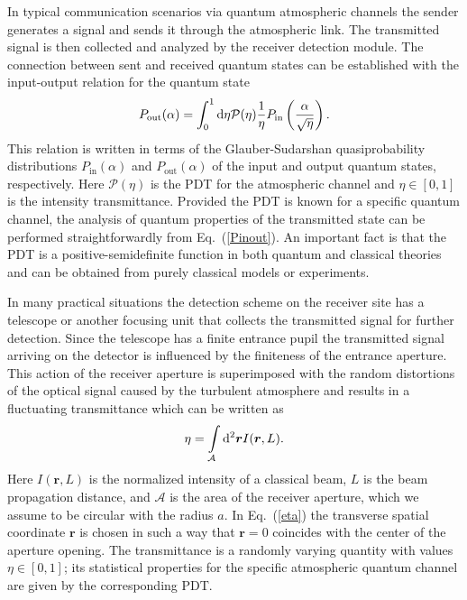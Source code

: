 \documentclass[aps,pra,twocolumn,a4paper,nofootinbib,preprintnumbers] {revtex4-1}
\newcommand{\D}{{\rm{d}}}
\begin{document}
	In  typical communication scenarios via quantum atmospheric channels the sender generates a signal and sends it through the atmospheric link.
	The transmitted signal is then   collected and analyzed  by the receiver detection module.
	The connection between  sent and received quantum states can be established  with the  input-output relation for the quantum state~\cite{Semenov2009}
		\begin{align}\label{Pinout}
		P_{\rm out}(\alpha)=\int_0^1\D\eta\mathcal{P}(\eta)\frac{1}{\eta}P_{\rm in}\left(\frac{\alpha}{\sqrt{\eta}}\right).
		\end{align}
	This relation is written in terms of the Glauber-Sudarshan  quasiprobability distributions \cite{Glauber, Sudarshan} $P_{\mathrm{in}}(\alpha)$ and $P_{\mathrm{out}}(\alpha)$ of the input and output quantum states, respectively.
	Here $\mathcal{P}(\eta)$ is the PDT for the  atmospheric channel and $\eta\in[0,1]$ is the intensity transmittance.
	Provided the PDT is known for a specific quantum channel, the analysis of quantum properties of the transmitted state  can be performed straightforwardly from Eq.~(\ref{Pinout}).
	An important fact is that the PDT is a positive-semidefinite function in both quantum and classical theories and can be obtained from purely classical models or experiments.

	In many practical situations the detection scheme on the receiver site has  a telescope or another focusing unit that collects the transmitted signal for further detection.
	Since the telescope has  a finite entrance  pupil the transmitted signal arriving on the detector is influenced  by the finiteness of the entrance aperture.
	This action of the receiver aperture is superimposed with the random distortions of the optical signal caused by the turbulent atmosphere and results in a fluctuating transmittance which can be written as
		\begin{align}\label{eta}
		\eta=\int\limits_{\mathcal{A}}\D^2\boldsymbol{r} I(\boldsymbol{r},L).
		\end{align}
	Here  $I(\boldsymbol{r},L)$ is the normalized intensity of a classical beam, $L$ is the beam propagation distance, and $\mathcal{A}$ is the area of the receiver aperture, which we assume to be circular with the radius $a$.
	In Eq.~(\ref{eta}) the transverse spatial coordinate $\boldsymbol{r}$ is chosen in such a way that $\boldsymbol{r}{=}0$ coincides with the center of the aperture opening.
	The transmittance is a randomly varying quantity with values $\eta\in[0,1]$; its statistical properties for the specific atmospheric quantum channel are given by the corresponding PDT.
\end{document}
